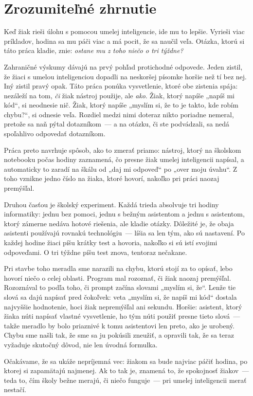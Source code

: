 \chapter{Zrozumiteľné zhrnutie}
\label{chapter:Lay-summary}

Keď žiak rieši úlohu s pomocou umelej inteligencie, ide mu to lepšie. Vyrieši viac príkladov, hodina sa mu páči viac a má pocit, že sa naučil veľa. Otázka, ktorú si táto práca kladie, znie: \emph{ostane mu z toho niečo o tri týždne?}

Zahraničné výskumy dávajú na prvý pohľad protichodné odpovede. Jeden zistil, že žiaci s umelou inteligenciou dopadli na neskoršej písomke horšie než tí bez nej. Iný zistil pravý opak. Táto práca ponúka vysvetlenie, ktoré obe zistenia spája: nezáleží na tom, \emph{či} žiak nástroj použije, ale \emph{ako}. Žiak, ktorý napíše „napíš mi kód“, si neodnesie nič. Žiak, ktorý napíše „myslím si, že to je takto, kde robím chybu?“, si odnesie veľa. Rozdiel medzi nimi doteraz nikto poriadne nemeral, pretože sa naň pýtal dotazníkom~--- a na otázku, či ste podvádzali, sa nedá spoľahlivo odpovedať dotazníkom.

Práca preto navrhuje spôsob, ako to zmerať priamo: nástroj, ktorý na školskom notebooku počas hodiny zaznamená, čo presne žiak umelej inteligencii napísal, a automaticky to zaradí na škálu od „daj mi odpoveď“ po „over moju úvahu“. Z toho vznikne jedno číslo na žiaka, ktoré hovorí, nakoľko pri práci naozaj premýšľal.

Druhou časťou je školský experiment. Každá trieda absolvuje tri hodiny informatiky: jednu bez pomoci, jednu s bežným asistentom a jednu s asistentom, ktorý zámerne nedáva hotové riešenia, ale kladie otázky. Dôležité je, že obaja asistenti používajú rovnakú technológiu~--- líšia sa len tým, ako sú nastavení. Po každej hodine žiaci píšu krátky test a hovoria, nakoľko si sú istí svojimi odpoveďami. O tri týždne píšu test znova, tentoraz nečakane.

Pri stavbe toho meradla sme narazili na chybu, ktorú stojí za to opísať, lebo hovorí niečo o celej oblasti. Program mal rozoznať, či žiak naozaj premýšľal. Rozoznával to podľa toho, či prompt začína slovami „myslím si, že“. Lenže tie slová sa dajú napísať pred čokoľvek: veta „myslím si, že napíš mi kód“ dostala najvyššie hodnotenie, hoci žiak nepremýšľal ani sekundu. Horšie: asistent, ktorý žiaka núti napísať vlastné vysvetlenie, ho tým núti použiť presne tieto slová~--- takže meradlo by bolo priaznivé k tomu asistentovi len preto, ako je urobený. Chybu sme našli tak, že sme sa ju pokúsili zneužiť, a opravili tak, že sa teraz vyžaduje skutočný dôvod, nie len úvodná formulka.

Očakávame, že sa ukáže nepríjemná vec: žiakom sa bude najviac páčiť hodina, po ktorej si zapamätajú najmenej. Ak to tak je, znamená to, že spokojnosť žiakov~--- teda to, čím školy bežne merajú, či niečo funguje~--- pri umelej inteligencii merať nestačí.
